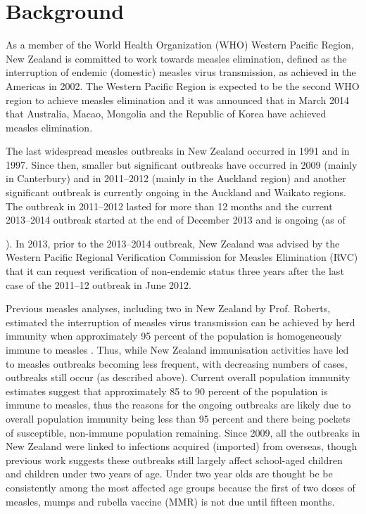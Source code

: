 \documentclass{article}
\begin{document}
\section{Background}

As a member of the World Health Organization (WHO) Western Pacific Region, New Zealand is committed to work towards measles elimination, defined as the interruption of endemic (domestic) measles virus transmission, as achieved in the Americas in 2002. The Western Pacific Region is expected to be the second WHO region to  achieve measles elimination and it was announced that in March 2014 that Australia, Macao, Mongolia and the Republic of Korea have achieved measles elimination.

The last widespread measles outbreaks in New Zealand occurred in 1991 and in 1997. Since then, smaller but significant outbreaks have occurred in 2009 (mainly in Canterbury) and in 2011--2012 (mainly in the Auckland region) and another significant outbreak is currently ongoing in the Auckland and Waikato regions. The outbreak in 2011--2012 lasted for more than 12 months and the current 2013--2014 outbreak started at the end of December 2013 and is ongoing (as of \date{3 July 2014}). In 2013, prior to the 2013--2014 outbreak, New Zealand was advised by the Western Pacific Regional Verification Commission for Measles Elimination (RVC) that it can request verification of non-endemic status three years after the last case of the 2011--12 outbreak in June 2012.

Previous measles analyses, including two in New Zealand by Prof. Roberts, estimated the interruption of measles virus transmission can be achieved by herd immunity when approximately 95 percent of the population is homogeneously immune to measles \citep{roberts0,roberts4}. Thus, while New Zealand immunisation activities have led to measles outbreaks becoming less frequent, with decreasing numbers of cases, outbreaks still occur (as described above). Current overall population immunity estimates suggest that approximately 85 to 90 percent of the population is immune to measles, thus the reasons for the ongoing outbreaks are likely due to overall population immunity being less than 95 percent and there being pockets of susceptible, non-immune population remaining. Since 2009, all the outbreaks in New Zealand were linked to infections acquired (imported) from overseas, though previous work suggests these outbreaks still largely affect school-aged children and children under two years of age. Under two year olds are thought be be consistently among the most affected age groups because the first of two doses of measles, mumps and rubella vaccine (MMR) is not due until fifteen months.
\end{document}
